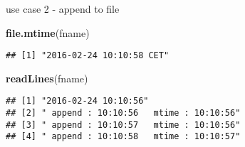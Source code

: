 \documentclass[ignorenonframetext,]{beamer}
\newenvironment{Shaded}{\begin{snugshade}}{\end{snugshade}}
\newcommand{\KeywordTok}[1]{\textcolor[rgb]{0.13,0.29,0.53}{\textbf{{#1}}}}
\newcommand{\NormalTok}[1]{{#1}}
\begin{document}
\begin{frame}[fragile]{use case 2 - append to file}

\begin{Shaded}
\begin{Highlighting}[]
\KeywordTok{file.mtime}\NormalTok{(fname)}
\end{Highlighting}
\end{Shaded}

\begin{verbatim}
## [1] "2016-02-24 10:10:58 CET"
\end{verbatim}

\begin{Shaded}
\begin{Highlighting}[]
\KeywordTok{readLines}\NormalTok{(fname)}
\end{Highlighting}
\end{Shaded}

\begin{verbatim}
## [1] "2016-02-24 10:10:56"                  
## [2] " append : 10:10:56   mtime : 10:10:56"
## [3] " append : 10:10:57   mtime : 10:10:56"
## [4] " append : 10:10:58   mtime : 10:10:57"
\end{verbatim}

\end{frame}
\end{document}
